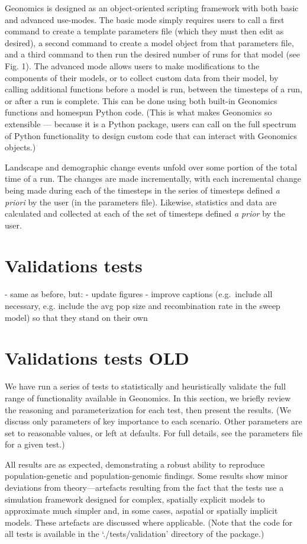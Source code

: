 ﻿\documentclass{article}
\begin{document}
Geonomics is designed as an object-oriented scripting framework with both basic and advanced use-modes.
The basic mode simply requires users to call a first command to create a template
parameters file (which they must then edit as desired), a second command to create
a model object from that parameters file, and a third command to then run the desired number
of runs for that model (see Fig. 1).
The advanced mode allows users to make modifications to the components of their models,
or to collect custom data from their model, by calling additional functions
before a model is run, between the timesteps of a run, or after a run is complete.
This can be done using both built-in Geonomics functions and homespun Python code.
(This is what makes Geonomics so extensible --- because it is a Python package, users can call on
the full spectrum of Python functionality to design custom code that can interact with Geonomics objects.)

Landscape and demographic change events unfold over some portion of the total time of a run.
The changes are made incrementally, with each incremental change being made 
during each of the timesteps in the series of timesteps defined \emph{a priori} by the user (in the parameters file).
Likewise, statistics and data are calculated and collected at each of the set of timesteps
defined \emph{a prior} by the user.


\section{Validations tests}
- same as before, but:
        - update figures
        - improve captions (e.g.\ include all necessary, e.g. include the avg pop size
        and recombination rate in the sweep model) so that they stand on their own

\section{Validations tests OLD}
We have run a series of tests to statistically and heuristically validate
the full range of functionality available in Geonomics.
In this section, we briefly review the reasoning and parameterization for each test,
then present the results.
(We discuss only parameters of key importance to each scenario.
Other parameters are set to reasonable values, or left at defaults.
For full details, see the parameters file for a given test.)

All results are as expected, demonstrating a robust ability to reproduce 
population-genetic and population-genomic findings.
Some results show minor deviations from theory---artefacts resulting from the fact
that the tests use a simulation framework designed for complex, spatially explicit models 
to approximate much simpler and, in some cases, aspatial or spatially implicit models.
These artefacts are discussed where applicable.
(Note that the code for all tests is available in the `./tests/validation' directory of the package.)
\end{document}
